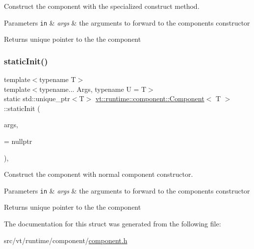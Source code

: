 Construct the component with the specialized construct method. 


\begin{DoxyParams}[1]{Parameters}
\mbox{\tt in}  & {\em args} & the arguments to forward to the component\textquotesingle{}s constructor\\
\hline
\end{DoxyParams}
\begin{DoxyReturn}{Returns}
unique pointer to the the component 
\end{DoxyReturn}
\mbox{\label{structvt_1_1runtime_1_1component_1_1_component_aaada4d04e8adf4cc5556bed2fdcdb321}} 
\subsubsection{\texorpdfstring{static\+Init()}{staticInit()}\hspace{0.1cm}{\footnotesize\ttfamily [2/2]}}
{\footnotesize\ttfamily template$<$typename T$>$ \\
template$<$typename... Args, typename U  = T$>$ \\
static std\+::unique\+\_\+ptr$<$T$>$ \hyperlink{structvt_1_1runtime_1_1component_1_1_component}{vt\+::runtime\+::component\+::\+Component}$<$ T $>$\+::static\+Init (\begin{DoxyParamCaption}\item[{Args \&\&...}]{args,  }\item[{\hyperlink{structvt_1_1runtime_1_1component_1_1_component_a389e53dbfc20013d66ef09d4f42c0a53}{has\+No\+Cons}$<$ U $>$ $\ast$}]{ = {\ttfamily nullptr} }\end{DoxyParamCaption})\hspace{0.3cm}{\ttfamily [inline]}, {\ttfamily [static]}}



Construct the component with normal component constructor. 


\begin{DoxyParams}[1]{Parameters}
\mbox{\tt in}  & {\em args} & the arguments to forward to the component\textquotesingle{}s constructor\\
\hline
\end{DoxyParams}
\begin{DoxyReturn}{Returns}
unique pointer to the the component 
\end{DoxyReturn}


The documentation for this struct was generated from the following file\+:\begin{DoxyCompactItemize}
\item 
src/vt/runtime/component/\hyperlink{component_8h}{component.\+h}\end{DoxyCompactItemize}
